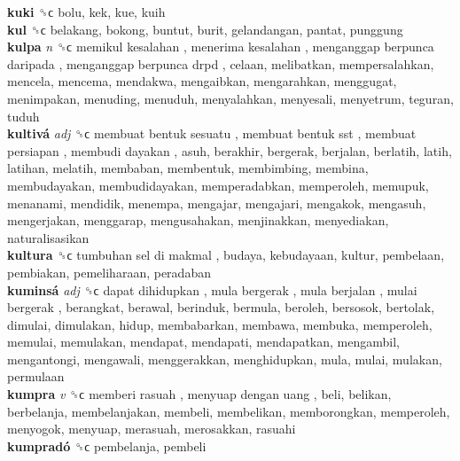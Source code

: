 \textbf{kuki} ␝ϲ  bolu, kek, kue, kuih  \\
\textbf{kul} ␝ϲ  belakang, bokong, buntut, burit, gelandangan, pantat, punggung  \\
\textbf{kulpa} \emph{n}  ␝ϲ   memikul kesalahan ,  menerima kesalahan ,  menganggap berpunca daripada ,  menganggap berpunca drpd , celaan, melibatkan, mempersalahkan, mencela, mencema, mendakwa, mengaibkan, mengarahkan, menggugat, menimpakan, menuding, menuduh, menyalahkan, menyesali, menyetrum, teguran, tuduh  \\
\textbf{kultivá} \emph{adj}  ␝ϲ   membuat bentuk sesuatu ,  membuat bentuk sst ,  membuat persiapan ,  membudi dayakan , asuh, berakhir, bergerak, berjalan, berlatih, latih, latihan, melatih, membaban, membentuk, membimbing, membina, membudayakan, membudidayakan, memperadabkan, memperoleh, memupuk, menanami, mendidik, menempa, mengajar, mengajari, mengakok, mengasuh, mengerjakan, menggarap, mengusahakan, menjinakkan, menyediakan, naturalisasikan  \\
\textbf{kultura} ␝ϲ   tumbuhan sel di makmal , budaya, kebudayaan, kultur, pembelaan, pembiakan, pemeliharaan, peradaban  \\
\textbf{kuminsá} \emph{adj}  ␝ϲ   dapat dihidupkan ,  mula bergerak ,  mula berjalan ,  mulai bergerak , berangkat, berawal, berinduk, bermula, beroleh, bersosok, bertolak, dimulai, dimulakan, hidup, membabarkan, membawa, membuka, memperoleh, memulai, memulakan, mendapat, mendapati, mendapatkan, mengambil, mengantongi, mengawali, menggerakkan, menghidupkan, mula, mulai, mulakan, permulaan  \\
\textbf{kumpra} \emph{v}  ␝ϲ   memberi rasuah ,  menyuap dengan uang , beli, belikan, berbelanja, membelanjakan, membeli, membelikan, memborongkan, memperoleh, menyogok, menyuap, merasuah, merosakkan, rasuahi  \\
\textbf{kumpradó} ␝ϲ  pembelanja, pembeli  \\
